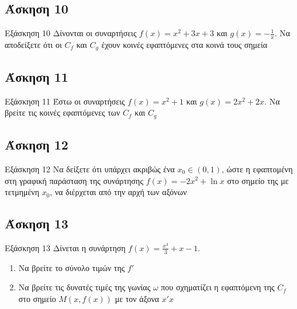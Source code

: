 \documentclass[greek]{beamer}
\begin{document}
\subsection{Άσκηση 10}
\begin{frame}[label=Άσκηση10]{Εξάσκηση 10}
 Δίνονται οι συναρτήσεις $f(x)=x^2+3x+3$ και $g(x)=-\frac{1}{x}$. Να αποδείξετε ότι οι $C_f$ και $C_g$ έχουν κοινές εφαπτόμενες στα κοινά τους σημεία

\end{frame}

\subsection{Άσκηση 11}
\begin{frame}[label=Άσκηση11]{Εξάσκηση 11}
 Έστω οι συναρτήσεις $f(x)=x^2+1$ και $g(x)=2x^2+2x$. Να βρείτε τις κοινές εφαπτόμενες των $C_f$ και $C_g$

\end{frame}

\subsection{Άσκηση 12}
\begin{frame}[label=Άσκηση12]{Εξάσκηση 12}
 Να δείξετε ότι υπάρχει ακριβώς ένα $x_0\in (0,1)$, ώστε η εφαπτομένη στη γραφική παράσταση της συνάρτησης $f(x)=-2x^2+\ln x$ στο σημείο της με τετμημένη $x_0$, να διέρχεται από την αρχή των αξόνων

\end{frame}

\subsection{Άσκηση 13}
\begin{frame}[label=Άσκηση13]{Εξάσκηση 13}
 Δίνεται η συνάρτηση $f(x)=\frac{x^3}{3}+x-1$.
 \begin{enumerate}
  \item<1-> Να βρείτε το σύνολο τιμών της $f'$
  \item<2-> Να βρείτε τις δυνατές τιμές της γωνίας $ω$ που σχηματίζει η εφαπτόμενη της $C_f$ στο σημείο $Μ(x,f(x))$ με τον άξονα $x'x$
 \end{enumerate}

\end{frame}
\end{document}
